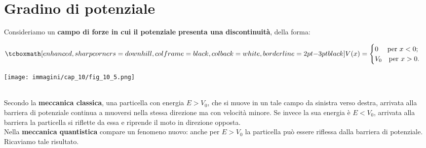 \section{Gradino di potenziale}
Consideriamo un \textbf{campo di forze in cui il potenziale presenta una discontinuità}, della forma:\\
\begin{minipage}{.55\textwidth}
	\begin{equation}
		\tcboxmath[enhanced, sharp corners=downhill, colframe=black, colback=white, borderline={2pt}{-3pt}{black}]{
			V(x)=
			\begin{cases}
			0 \quad \textrm{ per } x<0;\\
			V_0 \quad \textrm{per } x>0.
			\end{cases}
			}
	\end{equation}
\end{minipage}
\hspace{.2cm}
\begin{minipage}{.4\textwidth}
\texttt{[image: immagini/cap\_10/fig\_10\_5.png]}
\end{minipage}\\

Secondo la \textbf{meccanica classica}, una particella con energia $E>V_0$, che si muove in un tale campo da sinistra verso destra, arrivata alla barriera di potenziale continua a muoversi nella stessa direzione ma con velocità minore. Se invece la sua energia è $E<V_0$, arrivata alla barriera la particella si riflette da essa e riprende il moto in direzione opposta.\\

Nella \textbf{meccanica quantistica} compare un fenomeno nuovo: anche per $E>V_0$ la particella può essere riflessa dalla barriera di potenziale. Ricaviamo tale risultato.\\

